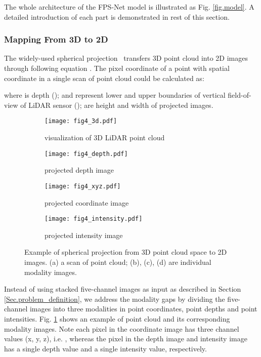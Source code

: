 \documentclass[preprint,review,3p]{elsarticle}
\begin{document}
The whole architecture of the FPS-Net model is illustrated as Fig. \ref{fig.model}. 
A detailed introduction of each part is demonstrated in rest of this section.

\subsubsection{Mapping From 3D to 2D} 

The widely-used spherical projection~\cite{wu2018squeezeseg,wu2019squeezesegv2, milioto2019rangenet++,xu2020squeezesegv3,alonso20203d,cortinhal2020salsanext,shi2020spsequencenet} transfers 3D point cloud into 2D images through following equation . The pixel coordinate  of a point with spatial coordinate  in a single scan of point cloud could be calculated as:

where  is depth ();  and  represent lower and upper boundaries of vertical field-of-view of LiDAR sensor ();  are height and width of projected images. 

\begin{figure}[ht]
  \centering
  \begin{subfigure}[b]{0.5\textwidth}
    \texttt{[image: fig4\_3d.pdf]}
    \caption{visualization of 3D LiDAR point cloud}
  \end{subfigure}
  \hfill
  \begin{subfigure}[b]{\textwidth}
    \texttt{[image: fig4\_depth.pdf]}
    \caption{projected depth image}
  \end{subfigure}
  \hfill
  \begin{subfigure}[b]{\textwidth}
    \texttt{[image: fig4\_xyz.pdf]}
    \caption{projected coordinate image}
  \end{subfigure}
  \hfill
  \begin{subfigure}[b]{\textwidth}
    \texttt{[image: fig4\_intensity.pdf]}
    \caption{projected intensity image}
  \end{subfigure}
  \caption{Example of spherical projection from 3D point cloud space to 2D images. (a) a scan of point cloud; (b), (c), (d) are individual modality images.}\label{figure.projection}
\end{figure}


Instead of using stacked five-channel images as input as described in Section \ref{Sec.problem_definition}, we address the modality gaps by dividing the five-channel images into three modalities in point coordinates, point depths and point intensities. Fig. \ref{figure.projection} shows an example of point cloud and its corresponding modality images. Note each pixel in the coordinate image has three channel values (x, y, z), i.e. , whereas the pixel in the depth image  and intensity image  has a single depth value and a single intensity value, respectively.
\end{document}
